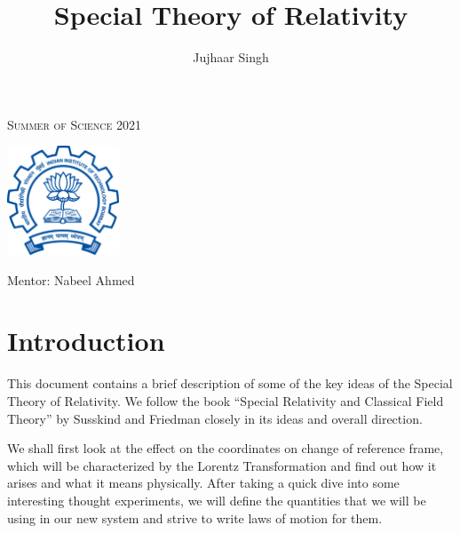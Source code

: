 \documentclass[12pt]{article}
\title{Special Theory of Relativity}
\author{
    Jujhaar Singh
}
\date{}
\numberwithin{equation}{section}
\theoremstyle{plain}
\theoremstyle{definition}
\newcommand{\myfont}{\fontfamily{cmss}\selectfont}
\newcommand{\myfontb}[1]{\textbf{\myfont #1}}
\begin{document}


\pagebreak

\begin{titlepage}
    \centering
    {\scshape\LARGE Summer of Science 2021 \par}
    \vspace{1.5cm}
    \includegraphics[width = 0.25\textwidth]
    {img/iitb_logo}\par
    \vspace{1cm}
    {\Huge \myfontb \@title \par}
    \vspace{3cm}
    {\Large\myfont
        \@author \par
        \large
        Mentor: Nabeel Ahmed
        \vfill
        {\large \@date \par}
    }\end{titlepage}

\pagebreak
\thispagestyle{empty}
\tableofcontents
\pagebreak

\setcounter{page}{1}


\section*{Introduction}
This document contains a brief description of some of the key ideas of the Special Theory of Relativity. We follow the book ``Special Relativity and Classical Field Theory'' by Susskind and Friedman closely in its ideas and overall direction.

We shall first look at the effect on the coordinates on change of reference frame, which will be characterized by the Lorentz Transformation and find out how it arises and what it means physically. After taking a quick dive into some interesting thought experiments, we will define the quantities that we will be using in our new system and strive to write laws of motion for them.

\pagebreak
\end{document}
